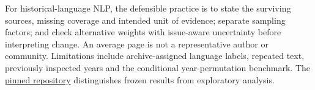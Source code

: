 \documentclass[10pt,letterpaper]{article}
\begin{document}
For historical-language NLP, the defensible practice is to state the surviving sources, missing coverage and intended unit of evidence; separate sampling factors; and check alternative weights with issue-aware uncertainty before interpreting change. An average page is not a representative author or community. Limitations include archive-assigned language labels, repeated text, previously inspected years and the conditional year-permutation benchmark. The \href{https://github.com/Stralb/isixhosa-archive-nlp/tree/aff05ae34597f28309dc94561adbcd962901e2f4}{pinned repository} distinguishes frozen results from exploratory analysis.

\clearpage

\setlength{\bibleftmargin}{.125in}
\setlength{\bibindent}{-\bibleftmargin}

\end{document}
